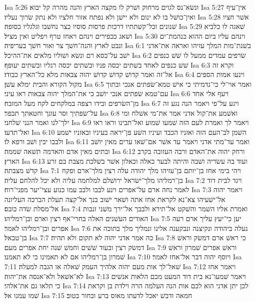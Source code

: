Isa 5:26  ונשׂא־נס לגוים מרחוק ושׁרק לו מקצה הארץ והנה מהרה קל יבוא׃
Isa 5:27  אין־עיף ואין־כושׁל בו לא ינום ולא יישׁן ולא נפתח אזור חלציו ולא נתק שׂרוך נעליו׃
Isa 5:28  אשׁר חציו שׁנונים וכל־קשׁתתיו דרכות פרסות סוסיו כצר נחשׁבו וגלגליו כסופה׃
Isa 5:29  שׁאגה לו כלביא ושׁאג ככפירים וינהם ויאחז טרף ויפליט ואין מציל׃
Isa 5:30  וינהם עליו ביום ההוא כנהמת־ים ונבט לארץ והנה־חשׁך צר ואור חשׁך בעריפיה׃
Isa 6:1  בשׁנת־מות המלך עזיהו ואראה את־אדני ישׁב על־כסא רם ונשׂא ושׁוליו מלאים את־ההיכל׃
Isa 6:2  שׂרפים עמדים ממעל לו שׁשׁ כנפים שׁשׁ כנפים לאחד בשׁתים יכסה פניו ובשׁתים יכסה רגליו ובשׁתים יעופף׃
Isa 6:3  וקרא זה אל־זה ואמר קדושׁ קדושׁ קדושׁ יהוה צבאות מלא כל־הארץ כבודו׃
Isa 6:4  וינעו אמות הספים מקול הקורא והבית ימלא עשׁן׃
Isa 6:5  ואמר אוי־לי כי־נדמיתי כי אישׁ טמא־שׂפתים אנכי ובתוך עם־טמא שׂפתים אנכי יושׁב כי את־המלך יהוה צבאות ראו עיני׃
Isa 6:6  ויעף אלי אחד מן־השׂרפים ובידו רצפה במלקחים לקח מעל המזבח׃
Isa 6:7  ויגע על־פי ויאמר הנה נגע זה על־שׂפתיך וסר עונך וחטאתך תכפר׃
Isa 6:8  ואשׁמע את־קול אדני אמר את־מי אשׁלח ומי ילך־לנו ואמר הנני שׁלחני׃
Isa 6:9  ויאמר לך ואמרת לעם הזה שׁמעו שׁמוע ואל־תבינו וראו ראו ואל־תדעו׃
Isa 6:10  השׁמן לב־העם הזה ואזניו הכבד ועיניו השׁע פן־יראה בעיניו ובאזניו ישׁמע ולבבו יבין ושׁב ורפא לו׃
Isa 6:11  ואמר עד־מתי אדני ויאמר עד אשׁר אם־שׁאו ערים מאין יושׁב ובתים מאין אדם והאדמה תשׁאה שׁממה׃
Isa 6:12  ורחק יהוה את־האדם ורבה העזובה בקרב הארץ׃
Isa 6:13  ועוד בה עשׂריה ושׁבה והיתה לבער כאלה וכאלון אשׁר בשׁלכת מצבת בם זרע קדשׁ מצבתה׃
Isa 7:1  ויהי בימי אחז בן־יותם בן־עזיהו מלך יהודה עלה רצין מלך־ארם ופקח בן־רמליהו מלך־ישׂראל ירושׁלם למלחמה עליה ולא יכל להלחם עליה׃
Isa 7:2  ויגד לבית דוד לאמר נחה ארם על־אפרים וינע לבבו ולבב עמו כנוע עצי־יער מפני־רוח׃
Isa 7:3  ויאמר יהוה אל־ישׁעיהו צא־נא לקראת אחז אתה ושׁאר ישׁוב בנך אל־קצה תעלת הברכה העליונה אל־מסלת שׂדה כובס׃
Isa 7:4  ואמרת אליו השׁמר והשׁקט אל־תירא ולבבך אל־ירך משׁני זנבות האודים העשׁנים האלה בחרי־אף רצין וארם ובן־רמליהו׃
Isa 7:5  יען כי־יעץ עליך ארם רעה אפרים ובן־רמליהו לאמר׃
Isa 7:6  נעלה ביהודה ונקיצנה ונבקענה אלינו ונמליך מלך בתוכה את בן־טבאל׃
Isa 7:7  כה אמר אדני יהוה לא תקום ולא תהיה׃
Isa 7:8  כי ראשׁ ארם דמשׂק וראשׁ דמשׂק רצין ובעוד שׁשׁים וחמשׁ שׁנה יחת אפרים מעם׃
Isa 7:9  וראשׁ אפרים שׁמרון וראשׁ שׁמרון בן־רמליהו אם לא תאמינו כי לא תאמנו׃
Isa 7:10  ויוסף יהוה דבר אל־אחז לאמר׃
Isa 7:11  שׁאל־לך אות מעם יהוה אלהיך העמק שׁאלה או הגבה למעלה׃
Isa 7:12  ויאמר אחז לא־אשׁאל ולא־אנסה את־יהוה׃
Isa 7:13  ויאמר שׁמעו־נא בית דוד המעט מכם הלאות אנשׁים כי תלאו גם את־אלהי׃
Isa 7:14  לכן יתן אדני הוא לכם אות הנה העלמה הרה וילדת בן וקראת שׁמו עמנו אל׃
Isa 7:15  חמאה ודבשׁ יאכל לדעתו מאוס ברע ובחור בטוב׃
